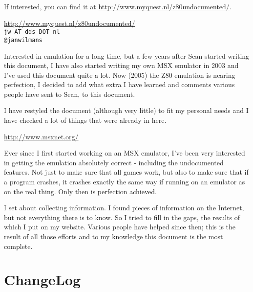 \documentclass[12pt,twoside,openright,a4paper]{book}
\begin{document}
If interested, you can find it at \url{http://www.myquest.nl/z80undocumented/}.

\begin{description}[style=unboxed,leftmargin=0cm]
	\item[Jan]\hfill
	
	\url{http://www.myquest.nl/z80undocumented/}\\
	{\tt jw AT dds DOT nl}\\
	{\tt @janwilmans}

	Interested in emulation for a long time, but a few years after Sean started writing this document, I have also started writing my own MSX emulator in 2003 and I've used this document quite a lot. Now (2005) the Z80 emulation is nearing perfection, I decided to add what extra I have learned and comments various people have sent to Sean, to this document.

	I have restyled the document (although very little) to fit my personal needs and I have checked a lot of things that were already in here.
 
	\item[Sean]\hfill

	\url{http://www.msxnet.org/}
	
	Ever since I first started working on an MSX emulator, I've been very interested in getting the emulation absolutely correct - including the undocumented features. Not just to make sure that all games work, but also to make sure that if a program crashes, it crashes exactly the same way if running on an emulator as on the real thing. Only then is perfection achieved.

	I set about collecting information. I found pieces of information on the Internet, but not everything there is to know. So I tried to fill in the gaps, the results of which I put on my website. Various people have helped since then; this is the result of all those efforts and to my knowledge this document is the most complete.
\end{description}


\pagebreak
\section{ChangeLog}
\end{document}
